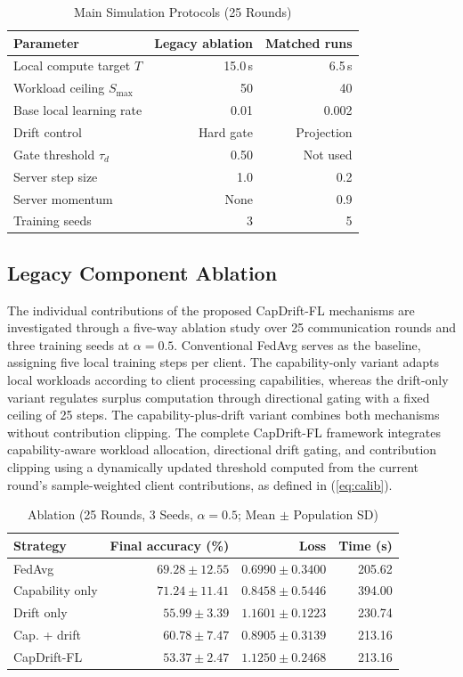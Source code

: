 \documentclass[conference]{IEEEtran}
\begin{document}
\begin{table}[t]
\caption{Main Simulation Protocols (25 Rounds)}
\label{tab:setup}
\centering\small
\begin{tabular}{@{}lrr@{}}
\toprule
Parameter & Legacy ablation & Matched runs\\
\midrule
Local compute target $T$ & 15.0\,s & 6.5\,s\\
Workload ceiling $S_{\max}$ & 50 & 40\\
Base local learning rate & 0.01 & 0.002\\
Drift control & Hard gate & Projection\\
Gate threshold $\tau_d$ & 0.50 & Not used\\
Server step size & 1.0 & 0.2\\
Server momentum & None & 0.9\\
Training seeds & 3 & 5\\
\bottomrule
\end{tabular}
\end{table}

\subsection{Legacy Component Ablation}
\label{subsec:ablation}

The individual contributions of the
proposed CapDrift-FL mechanisms are
investigated through a five-way ablation
study over 25 communication rounds and
three training seeds at $\alpha=0.5$.
Conventional FedAvg serves as the baseline, assigning five local training steps per client. The capability-only variant adapts local workloads according to client processing capabilities, whereas the drift-only variant regulates surplus computation through directional gating with a fixed ceiling of 25 steps.
 The capability-plus-drift variant combines both mechanisms without contribution clipping. The complete CapDrift-FL framework integrates capability-aware workload allocation, directional drift gating, and contribution clipping using a dynamically updated threshold computed from the current round's sample-weighted client contributions, as defined in (\ref{eq:calib}).

\begin{table}[t]
\caption{Ablation (25 Rounds, 3 Seeds, $\alpha=0.5$; Mean $\pm$ Population SD)}
\label{tab:ablation}
\centering\scriptsize
\begin{tabular}{@{}lrrr@{}}
\toprule
Strategy & Final accuracy (\%) & Loss & Time (s)\\
\midrule
FedAvg & $69.28\pm12.55$ & $0.6990\pm0.3400$ & 205.62\\
Capability only & $71.24\pm11.41$ & $0.8458\pm0.5446$ & 394.00\\
Drift only & $55.99\pm3.39$ & $1.1601\pm0.1223$ & 230.74\\
Cap. + drift & $60.78\pm7.47$ & $0.8905\pm0.3139$ & 213.16\\
CapDrift-FL & $53.37\pm2.47$ & $1.1250\pm0.2468$ & 213.16\\
\bottomrule
\end{tabular}
\end{table}
\end{document}
